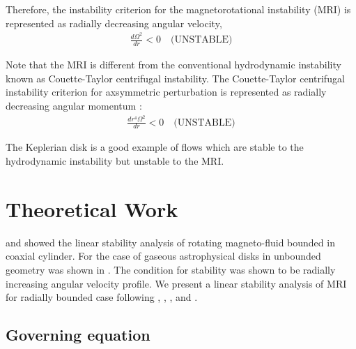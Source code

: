 \documentclass{jfm}
\begin{document}
Therefore, the instability criterion for the magnetorotational instability (MRI)
is represented as radially decreasing angular velocity,
\begin{align}
    \frac{d \Omega^2}{dr}<0 \quad \text{(UNSTABLE)}
\end{align} 

Note that the MRI is different from the conventional hydrodynamic instability 
known as Couette-Taylor centrifugal instability. The Couette-Taylor centrifugal
instability criterion for axsymmetric perturbation is represented as radially 
decreasing angular momentum \cite[see][]{Charru2011}:
\begin{align}
    \frac{d r^4 \Omega^2}{dr} <0 \quad \text{(UNSTABLE)}
\end{align}

The Keplerian disk is a good example of flows which are stable to the 
hydrodynamic instability but unstable to the MRI.



\section{Theoretical Work}
\label{sec:theory}

\cite{Acheson1973} and \cite{Knobloch1992} showed the linear stability analysis
of rotating magneto-fluid bounded in coaxial cylinder. For the case of gaseous 
astrophysical disks in unbounded geometry was shown in \cite{Balbus1991}. The 
condition for stability was shown to be radially increasing angular velocity 
profile. We present a linear stability analysis of MRI for radially bounded case 
following \cite{Acheson1972}, \cite{Acheson1973a}, \cite{Knobloch1992}, and 
\cite{Julien2010}.


%
%
\subsection{Governing equation}
\end{document}
